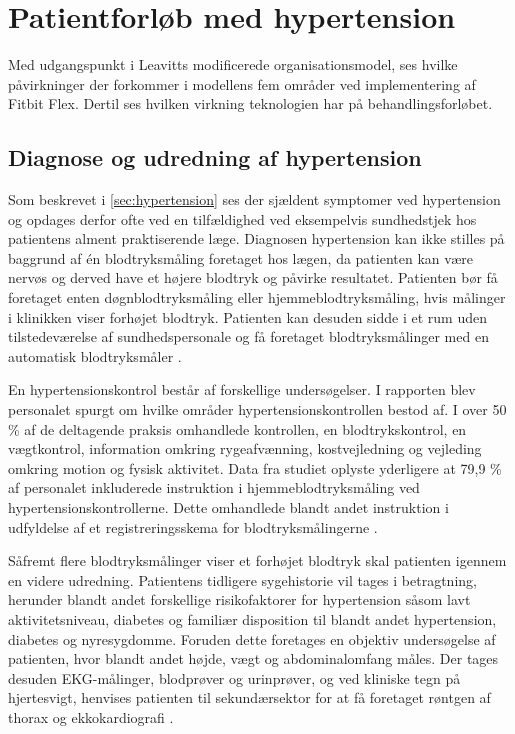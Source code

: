 \section{Patientforløb med hypertension}
Med udgangspunkt i Leavitts modificerede organisationsmodel, ses hvilke påvirkninger der forkommer i modellens fem områder ved implementering af Fitbit Flex. Dertil ses hvilken virkning teknologien har på behandlingsforløbet.

\subsection{Diagnose og udredning af hypertension} \label{sec:dia_hypertension}
Som beskrevet i \autoref{sec:hypertension} ses der sjældent symptomer ved hypertension og opdages derfor ofte ved en tilfældighed ved eksempelvis sundhedstjek hos patientens alment praktiserende læge. 
Diagnosen hypertension kan ikke stilles på baggrund af én blodtryksmåling foretaget hos lægen, da patienten kan være nervøs og derved have et højere blodtryk og påvirke resultatet. Patienten bør få foretaget enten døgnblodtryksmåling eller hjemmeblodtryksmåling, hvis målinger i klinikken viser forhøjet blodtryk. Patienten kan desuden sidde i et rum uden tilstedeværelse af sundhedspersonale og få foretaget blodtryksmålinger med en automatisk blodtryksmåler \citep{lodberg2016, bech2015}.

En hypertensionskontrol består af forskellige  undersøgelser. I rapporten  blev personalet spurgt om hvilke områder hypertensionskontrollen bestod af. I over 50 \% af de deltagende praksis omhandlede kontrollen, en blodtrykskontrol, en vægtkontrol, information omkring rygeafvænning, kostvejledning og vejleding omkring motion og fysisk aktivitet. Data fra studiet oplyste yderligere at 79,9 \% af personalet inkluderede instruktion i hjemmeblodtryksmåling ved hypertensionskontrollerne. Dette omhandlede blandt andet instruktion i udfyldelse af et registreringsskema for blodtryksmålingerne \citep{munck2007}. 

Såfremt flere blodtryksmålinger viser et forhøjet blodtryk skal patienten igennem en videre udredning. Patientens tidligere sygehistorie vil tages i betragtning, herunder blandt andet forskellige risikofaktorer for hypertension såsom lavt aktivitetsniveau, diabetes og familiær disposition til blandt andet hypertension, diabetes og nyresygdomme. Foruden dette foretages en objektiv undersøgelse af patienten, hvor blandt andet højde, vægt og abdominalomfang måles. Der tages desuden EKG-målinger, blodprøver og urinprøver, og ved kliniske tegn på hjertesvigt, henvises patienten til sekundærsektor for at få foretaget røntgen af thorax og ekkokardiografi \citep{lodberg2016, bech2015}.

